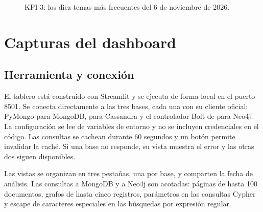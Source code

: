 \documentclass[11pt,a4paper]{article}
\newcommand{\code}[1]{\detokenize{#1}}
\begin{document}
\begin{figure}[H]
\centering
{}
\caption{KPI 3: los diez temas más frecuentes del 6 de noviembre de 2026.}
\end{figure}

\section{Capturas del dashboard}\label{sec:dashboard}

\subsection{Herramienta y conexión}

El tablero está construido con Streamlit y se ejecuta de forma local en el puerto 8501. Se conecta directamente a las tres bases, cada una con su cliente oficial: PyMongo para MongoDB, \code{cassandra-driver} para Cassandra y el controlador Bolt de \code{neo4j} para Neo4j. La configuración se lee de variables de entorno y no se incluyen credenciales en el código. Las consultas se cachean durante 60 segundos y un botón permite invalidar la caché. Si una base no responde, su vista muestra el error y las otras dos siguen disponibles.

Las vistas se organizan en tres pestañas, una por base, y comparten la fecha de análisis. Las consultas a MongoDB y a Neo4j son acotadas: páginas de hasta 100 documentos, grafos de hasta cinco registros, parámetros en las consultas Cypher y escape de caracteres especiales en las búsquedas por expresión regular.
\end{document}
